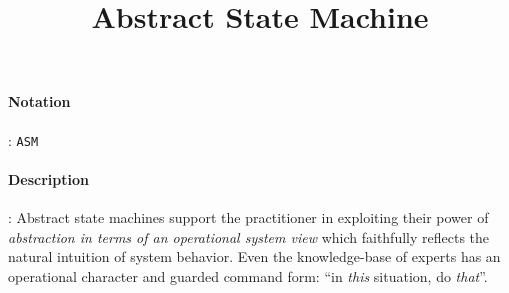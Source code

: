 \documentclass[10pt,a4paper,oneside]{scrartcl}
\title{Abstract State Machine}
\date{}
\begin{document}
\maketitle
\paragraph{Notation}: \texttt{ASM}
\paragraph{Description}: Abstract state machines support the practitioner in exploiting their power of \textsl{abstraction in terms of an operational system view} which faithfully reflects the natural intuition of system behavior. Even the knowledge-base of experts has an operational character and guarded command form: ``in \textit{this} situation, do \textit{that}''.
\end{document}
